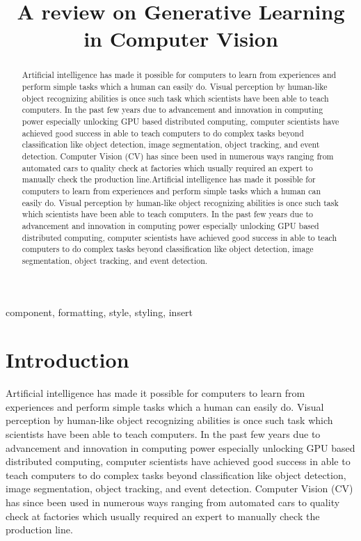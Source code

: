 \documentclass[conference]{IEEEtran}
\begin{document}
\title{A review on Generative Learning in Computer Vision}

\author{
}

\maketitle

\begin{abstract}
Artificial intelligence has made it possible for computers to learn from experiences and perform simple tasks which a human can easily do. Visual perception by human-like object recognizing abilities is once such task which scientists have been able to teach computers. In the past few years due to advancement and innovation in computing power especially unlocking GPU based distributed computing, computer scientists have achieved good success in able to teach computers to do complex tasks beyond classification like object detection, image segmentation, object tracking, and event detection. Computer Vision (CV) has since been used in numerous ways ranging from automated cars to quality check at factories which usually required an expert to manually check the production line.Artificial intelligence has made it possible for computers to learn from experiences and perform simple tasks which a human can easily do. Visual perception by human-like object recognizing abilities is once such task which scientists have been able to teach computers. In the past few years due to advancement and innovation in computing power especially unlocking GPU based distributed computing, computer scientists have achieved good success in able to teach computers to do complex tasks beyond classification like object detection, image segmentation, object tracking, and event detection.
\end{abstract}

\begin{IEEEkeywords}
component, formatting, style, styling, insert
\end{IEEEkeywords}

\section{Introduction}
Artificial intelligence has made it possible for computers to learn from experiences and perform simple tasks which a human can easily do. Visual perception by human-like object recognizing abilities is once such task which scientists have been able to teach computers. In the past few years due to advancement and innovation in computing power especially unlocking GPU based distributed computing, computer scientists have achieved good success in able to teach computers to do complex tasks beyond classification like object detection, image segmentation, object tracking, and event detection. Computer Vision (CV) has since been used in numerous ways ranging from automated cars to quality check at factories which usually required an expert to manually check the production line.
\end{document}
